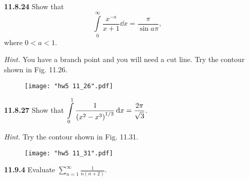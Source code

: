 \documentclass{article}
\begin{document}
\begin{enumerate}
    \item [\textbf{11.8.24}] Show that
    \[
        \int\limits_0^\infty \frac{x^{-a}}{x+1}\dd{x} = \frac{\pi}{\sin a\pi},
    \]
    where $0<a<1$.

    \textit{Hint.} You have a branch point and you will need a cut line. Try the contour shown in Fig. 11.26.
    \begin{figure}[H]
    \centering
    \texttt{[image: "hw5 11\_26".pdf]}
    \end{figure}

    \newpage
    \item [\textbf{11.8.27}] Show that $\displaystyle\int\limits_0^1 \frac{1}{\pqty{x^2-x^3}^{1/3}}\dd{x} = \frac{2\pi}{\sqrt{3}}$.

    \textit{Hint.} Try the contour shown in Fig. 11.31.
    \begin{figure}[H]
    \centering
    \texttt{[image: "hw5 11\_31".pdf]}
    \end{figure}

    \item [\textbf{11.9.4}] Evaluate $\displaystyle\sum_{n=1}^\infty \frac{1}{n(n+2)}$.
\end{enumerate}
\end{document}
